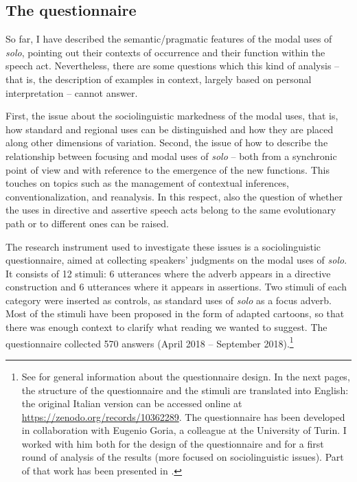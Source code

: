 \subsection{The questionnaire}
\hypertarget{Toc124860671}{}
So far, I have described the semantic/pragmatic features of the modal uses of \textit{solo}, pointing out their contexts of occurrence and their function within the speech act. Nevertheless, there are some questions which this kind of analysis – that is, the description of examples in context, largely based on personal interpretation – cannot answer.

First, the issue about the sociolinguistic markedness of the modal uses, that is, how standard and regional uses can be distinguished and how they are placed along other dimensions of variation. Second, the issue of how to describe the relationship between focusing and modal uses of \textit{solo} – both from a synchronic point of view and with reference to the emergence of the new functions. This touches on topics such as the management of contextual inferences, conventionalization, and reanalysis. In this respect, also the question of whether the uses in directive and assertive speech acts belong to the same evolutionary path or to different ones can be raised.

The research instrument used to investigate these issues is a sociolinguistic questionnaire, aimed at collecting speakers’ judgments on the modal uses of \textit{solo}. It consists of 12 stimuli: 6 utterances where the adverb appears in a directive construction and 6 utterances where it appears in assertions. Two stimuli of each category were inserted as controls, as standard uses of \textit{solo} as a focus adverb. Most of the stimuli have been proposed in the form of adapted cartoons, so that there was enough context to clarify what reading we wanted to suggest. The questionnaire collected 570 answers ({April 2018} – {September 2018}).\footnote{See  for general information about the questionnaire design. In the next pages, the structure of the questionnaire and the stimuli are translated into English: the original Italian version can be accessed online at \url{https://zenodo.org/records/10362289}. The questionnaire has been developed in collaboration with Eugenio Goria, a colleague at the University of Turin. I worked with him both for the design of the questionnaire and for a first round of analysis of the results (more focused on sociolinguistic issues). Part of that work has been presented in \citet{FavaroGoria2019}.}

